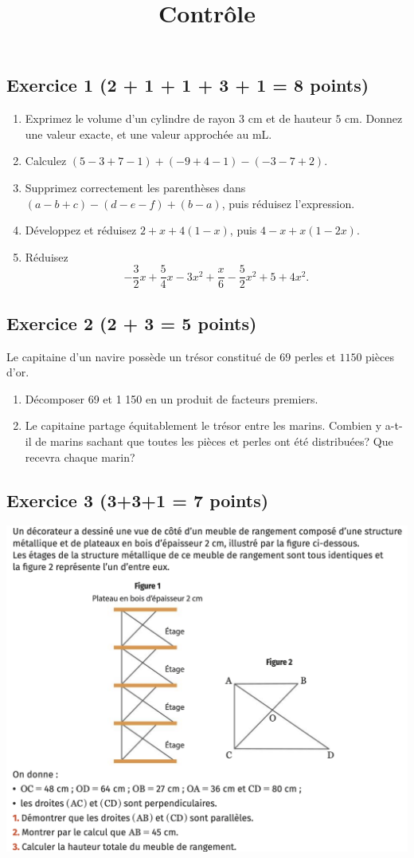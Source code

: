 \documentclass[14 pt, fleqn]{extarticle}
\title{Contrôle}
\date{}
\theoremstyle{plain}
\begin{document}
 \subsection*{Exercice 1 (2 + 1 + 1 + 3 + 1 = 8 points) }
 
 \begin{enumerate}
  \item Exprimez le volume d'un cylindre de rayon $3$ cm et de hauteur $5$ cm. Donnez une valeur exacte, et une valeur approchée au mL.
 \item Calculez $(5-3+7-1) + (-9+4-1) - (-3-7+2)$.
 
  \item Supprimez correctement les parenthèses dans 
 $(a-b+c) - (d-e-f) + (b-a)$, puis réduisez l'expression.
  \item Développez et réduisez $2 + x + 4(1-x)$, puis $4 - x + x(1-2x)$.
   \item Réduisez 
 $$ - \frac32x+ \frac54x - 3x^2 + \frac{x}6 - \frac52 x^2 + 5 + 4 x^2.$$
 \end{enumerate}
 
 \subsection*{Exercice 2 (2 + 3 = 5 points)}
 Le capitaine d'un navire possède un trésor constitué de $69$ perles et $1150$ pièces d'or.\begin{enumerate}
\item Décomposer 69 et 1 150 en un produit de facteurs premiers.
\item  Le capitaine partage équitablement le trésor entre les marins. Combien y a-t-il de marins sachant que toutes les pièces et perles ont été distribuées? Que recevra chaque marin?

\end{enumerate}
 
 \subsection*{Exercice 3 (3+3+1 = 7 points)}
 \includegraphics[scale=.6]{Exo}
  
 	
\end{document}
